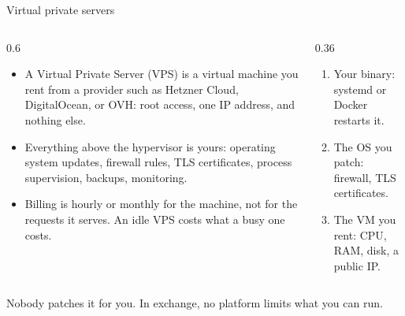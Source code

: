\documentclass[10pt,aspectratio=169,t]{beamer}
\begin{document}
\begin{frame}[eyebrow=VPS]{Virtual private servers}
  \begin{columns}[T]
    \begin{column}{0.6\textwidth}
      \begin{itemize}
        \item A Virtual Private Server (VPS) is a virtual machine you rent from a provider such as Hetzner Cloud, DigitalOcean, or OVH: root access, one IP address, and nothing else.
        \item Everything above the hypervisor is yours: operating system updates, firewall rules, TLS certificates, process supervision, backups, monitoring.
        \item Billing is hourly or monthly for the machine, not for the requests it serves. An idle VPS costs what a busy one costs.
      \end{itemize}
    \end{column}
    \begin{column}{0.36\textwidth}
      \begin{enumerate}
        \item Your binary: systemd or Docker restarts it.
        \item The OS you patch: firewall, TLS certificates.
        \item The VM you rent: CPU, RAM, disk, a public IP.
      \end{enumerate}
    \end{column}
  \end{columns}
  \begin{takeaway}{Nobody patches it for you.}
    In exchange, no platform limits what you can run.
  \end{takeaway}
\end{frame}
\end{document}

